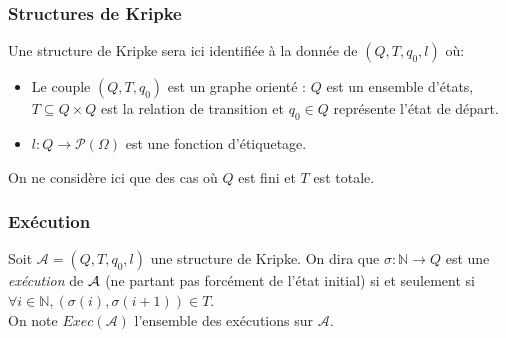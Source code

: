 \documentclass[10pt,a4paper]{article}
\begin{document}
\subsubsection{Structures de Kripke}
Une structure de Kripke sera ici identifiée à la donnée de $(Q,T,q_0,l)$ où:
\begin{itemize}
\item Le couple $(Q,T, q_0)$ est un graphe orienté : $Q$ est un ensemble d'états, $T \subseteq Q \times Q$ est la relation de transition et $q_0 \in Q$ représente l'état de départ.
\item $l : Q \to \mathcal{P}(\Omega)$ est une fonction d'étiquetage.
\end{itemize}
\bigskip
On ne considère ici que des cas où $Q$ est fini et $T$ est totale.

\subsubsection{Exécution}
Soit $\mathcal{A} = (Q,T,q_0,l)$ une structure de Kripke.
On dira que $\sigma : \mathbb{N} \to Q$ est une \emph{exécution} de $\cal{A}$ (ne partant pas forcément de l'état initial) si et seulement si $\forall i \in \mathbb{N}, (\sigma (i), \sigma (i+1)) \in T$. 
\\
On note $Exec(\mathcal{A})$ l'ensemble des exécutions sur $\mathcal{A}$.
\end{document}
